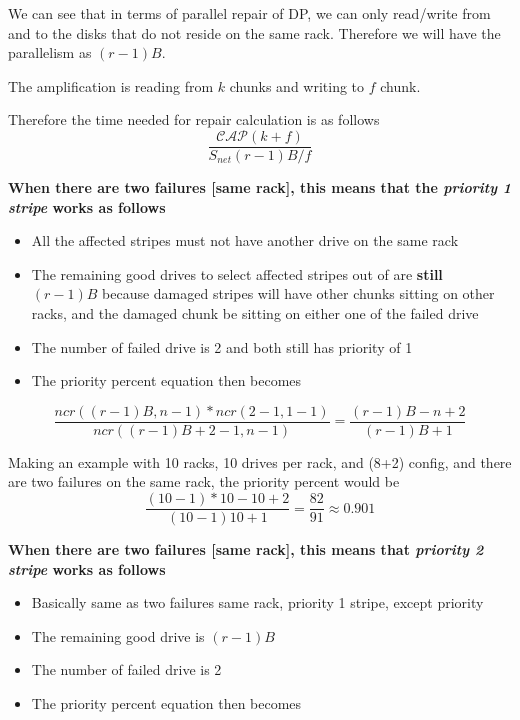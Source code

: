 \documentclass[journal]{IEEEtran}
\begin{document}
We can see that in terms of parallel repair of DP, we can only read/write from and to the disks that do not reside on the same rack. Therefore we will have the parallelism as $(r-1)B$. 

The amplification is reading from $k$ chunks and writing to $f$ chunk.

Therefore the time needed for repair calculation is as follows
\begin{equation*}
  \frac{\mathcal{CAP}(k+f)}{S_{net}(r-1)B/f}
\end{equation*}

\textbf{When there are two failures [same rack], this means that the \textit{priority 1 stripe} works as follows}
\begin{itemize}
  \item All the affected stripes must not have another drive on the same rack
  \item The remaining good drives to select affected stripes out of are \textbf{still} $(r-1)B$ because damaged stripes will have other chunks sitting on other racks, and the damaged chunk be sitting on either one of the failed drive
  \item The number of failed drive is 2 and both still has priority of 1
  \item The priority percent equation then becomes
\end{itemize}

\begin{equation*}
  \frac{ncr((r-1)B, n-1)*ncr(2-1, 1-1)}{ncr((r-1)B+2-1, n-1)}=\frac{(r-1)B-n+2}{(r-1)B+1}
\end{equation*}

Making an example with 10 racks, 10 drives per rack, and (8+2) config, and there are two failures on the same rack, the priority percent would be
\begin{equation*}
  \frac{(10-1)*10-10+2}{(10-1)10+1}=\frac{82}{91}\approx 0.901
\end{equation*}

\textbf{When there are two failures [same rack], this means that \textit{priority 2 stripe} works as follows}
\begin{itemize}
  \item Basically same as two failures same rack, priority 1 stripe, except priority
  \item The remaining good drive is $(r-1)B$
  \item The number of failed drive is 2
  \item The priority percent equation then becomes
\end{itemize}
\end{document}
